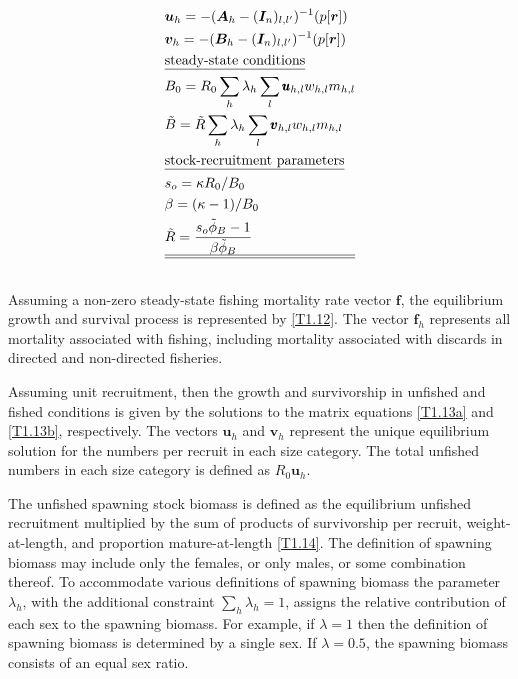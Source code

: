 \documentclass[12pt,letterpaper]{article}
\newcounter{saveEq}
\def\getEq{\setcounter{equation}{\value{saveEq}}}
\def\normalEq{ %
    \getEq
    \renewcommand{\theequation}{\arabic{section}.\arabic{equation}}}
\begin{document}
\begin{table}
\begin{align}
    & \bm{u}_h   = -(\bm{A}_h - (\bm{I}_n)_{l,l'})^{-1} (p[\bm{r}]) \label{T1.13a}\\
    & \bm{v}_h   = -(\bm{B}_h - (\bm{I}_n)_{l,l'})^{-1} (p[\bm{r}]) \label{T1.13b}\\
    &\mbox{\underline{steady-state conditions}}\nonumber \\
    & B_0 = R_0 \sum_h \lambda_h \sum_l \pmb{u}_{h,l} w_{h,l} m_{h,l} \label{T1.14}\\
    & \tilde{B} = \tilde{R}\sum_h \lambda_h \sum_l \pmb{v}_{h,l} w_{h,l} m_{h,l} \label{T1.16}\\
    &\mbox{\underline{stock-recruitment parameters}}\nonumber\\
    &s_o = \kappa R_0 / B_0 \label{T1.17}\\
    &\beta = (\kappa -1)/B_0 \label{T1.18}\\
    &\tilde{R} = \frac{s_o \tilde{\phi}_B -1}{\beta \tilde{\phi}_B} \label{T1.19}\\
    \hline \hline \nonumber
  \end{align}
\normalEq
\end{table}

    Assuming a non-zero steady-state fishing mortality rate vector $\pmb{f}$, the equilibrium growth and survival process is represented by \eqref{T1.12}.  The vector $\bm{f}_h$ represents all mortality associated with fishing, including mortality associated with discards in directed and non-directed fisheries.

    Assuming unit recruitment, then the growth and survivorship in unfished and fished conditions is given by the solutions to the matrix equations \eqref{T1.13a} and \eqref{T1.13b}, respectively.   The vectors $\bm{u}_h$ and $\bm{v}_h$ represent the unique equilibrium solution for the numbers per recruit in each size category.  The total unfished numbers in each size category is defined as $R_0 \bm{u}_h$.

    The unfished spawning stock biomass is defined as the equilibrium unfished recruitment multiplied by the sum of products of survivorship per recruit, weight-at-length, and proportion mature-at-length \eqref{T1.14}.  The definition of spawning  biomass may include only the females, or only males, or some combination thereof. To accommodate various definitions of spawning biomass the parameter $\lambda_h$, with the additional constraint $\sum_h \lambda_h = 1$, assigns the relative contribution of each sex to the spawning biomass.  For example, if $\lambda = 1$  then the definition of spawning biomass is determined by a single sex. If $\lambda = 0.5$, the spawning biomass consists of an equal sex ratio.
\end{document}
